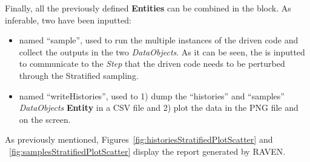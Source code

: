 \begin{enumerate}
\begin{figure}[h!]
  \label{fig:samplesStratifiedPlotLine}
 \end{figure}
   Finally, all the previously defined \textbf{Entities} can be combined in
   the  block. As inferable,
   two  have been inputted:
   \begin{itemize}
     \item {} named ``sample'', used to run the multiple
     instances of the driven code and
     collect the outputs in the two \textit{DataObjects}. As it can be
     seen, the  is inputted to communicate to the
     \textit{Step} that the driven code needs to
     be perturbed through the Stratified sampling.
     \item  {} named ``writeHistories'', used to 1) dump
     the ``histories'' and ``samples'' \textit{DataObjects}
     \textbf{Entity} in a CSV file and 2) plot the data in the PNG file and
     on the screen.
   \end{itemize}
\end{enumerate}
 As previously mentioned, Figures~\ref{fig:historiesStratifiedPlotScatter} and ~\ref{fig:samplesStratifiedPlotScatter}  display the report generated by RAVEN.


